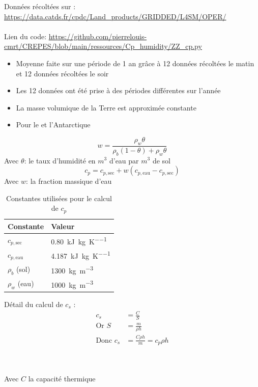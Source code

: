 \documentclass[a4paper,12pt]{article}
\begin{document}
Données récoltées sur : 
\url{https://data.catds.fr/cpdc/Land_products/GRIDDED/L4SM/OPER/}
\\
\\
Lien du code: \url{https://github.com/pierrelouis-cmrt/CREPES/blob/main/ressources/Cp_humidity/ZZ_cp.py}

\begin{itemize}
    \item Moyenne faite sur une période de 1 an grâce à 12 données récoltées le matin et 12 données récoltées le soir 
    \item Les 12 données ont été prise à des périodes différentes sur l'année 
    \item La masse volumique de la Terre est approximée constante 
    \item Pour le  et l’Antarctique  
\end{itemize}
\[
w = \frac{\rho_w \theta}{\rho_b (1 - \theta) + \rho_w \theta}
\]
Avec \(\theta\): le taux d'humidité en \(m^3\) d'eau par \(m^3\) de sol 
\[
c_p = c_{p,\text{sec}} + w (c_{p,\text{eau}} - c_{p,\text{sec}})
\]
Avec \(w\): la fraction massique d'eau 
\begin{table}[h!]
\centering
\begin{tabular}{ll}
\textbf{Constante} & \textbf{Valeur} \\
\hline
$c_{p,\text{sec}}$ & \SI{0.80}{\kilo\joule\per\kilogram\per\kelvin} \\
$c_{p,\text{eau}}$ & \SI{4.187}{\kilo\joule\per\kilogram\per\kelvin} \\
$\rho_b$ (sol) & \SI{1300}{\kilogram\per\cubic\metre} \\
$\rho_w$ (eau) & \SI{1000}{\kilogram\per\cubic\metre} \\
\end{tabular}
\caption*{Constantes utilisées pour le calcul de $c_p$}
\vspace{1cm}
\end{table}

Détail du calcul de \( c_s \) :\\
\begin{align*}
c_s &= \frac{C}{S} \\
\text{Or } S &= \frac{m}{\rho h} \\
\text{Donc } c_s &= \frac{C \rho h}{m} = c_p  \rho  h
\end{align*}

\\
\\
Avec \( C \) la capacité thermique
\\
\end{document}

